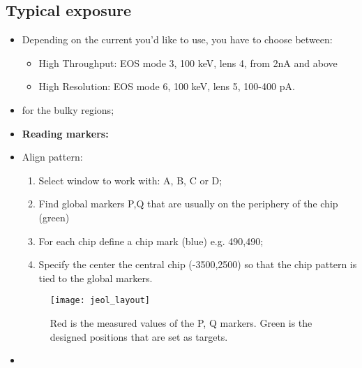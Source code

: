  \subsection{Typical exposure}
 \label{sec:typic-expos-param}
 \begin{itemize}
 \item Depending on the current you'd like to use, you have to choose between:
   \begin{itemize}
   \item High Throughput: EOS mode 3, 100 keV, lens 4, from 2nA and above
   \item High Resolution: EOS mode 6, 100 keV, lens 5, 100-400 pA.
   \end{itemize}
 \item {} for the bulky regions;
 \item \textbf{Reading markers:}
 \item Align pattern:
   \begin{enumerate}
   \item Select window to work with: A, B, C or D;
   \item Find global markers P,Q that are usually on the periphery of the chip (green)
   \item For each chip define a chip mark (blue) e.g. 490,490;
   \item Specify the center the central chip (-3500,2500)  so that the chip pattern is tied to
     the global markers.
   \end{enumerate}
   \begin{figure}[h]
     \centering \texttt{[image: jeol\_layout]}
     \caption{\small Red is  the measured values of  the P, Q markers.  Green  is the designed
       positions that are set as targets. \label{fig:jeol_layout}}
   \end{figure}
 \item
 \end{itemize}
